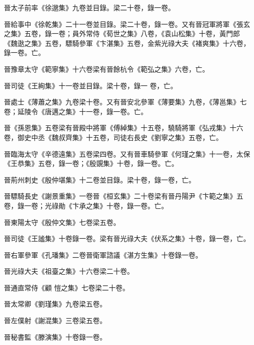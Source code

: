 \begin{pinyinscope}
 晉太子前率《徐邈集》九卷並目錄。梁二十卷，錄一卷。



 晉給事中《徐乾集》二十一卷並目錄。梁二十卷，錄一卷。又有晉冠軍將軍《張玄之集》五卷，錄一卷；員外常侍《荀世之集》八卷，《袁山松集》十卷，黃門郎《魏逖之集》五卷，驃騎參軍《卞湛集》五卷，金紫光祿大夫《褚爽集》十六卷，錄一卷。亡。



 晉豫章太守《範寧集》十六卷梁有晉餘杭令《範弘之集》六卷，亡。



 晉司徒《王絢集》十一卷並目錄。梁十卷，錄一
 卷，亡。



 晉處士《薄蕭之集》九卷梁十卷。又有晉安北參軍《薄要集》九卷，《薄邕集》七卷；延陵令《唐邁之集》十一卷，錄一卷。亡。



 晉《孫恩集》五卷梁有晉殿中將軍《傅綽集》十五卷，驍騎將軍《弘戎集》十六卷，御史中丞《魏叔齊集》十五卷，司徒右長史《劉寧之集》五卷，亡。



 晉臨海太守《辛德遠集》五卷梁四卷。又有晉車騎參軍《何瑾之集》十一卷，太保《王恭集》五卷，錄一卷；《殷覬集》十卷，錄一卷。亡。



 晉荊州刺史《殷仲堪集》十二卷並目錄。梁十卷，錄一卷，亡。



 晉驃騎長史《謝景重集》一卷晉《桓玄集》二十卷梁有晉丹陽尹《卞範之集》五卷，錄一卷；光祿勛《卞承之集》十卷，錄一卷。亡。



 晉東陽太守《殷仲文集》七卷梁五卷。



 晉司徒《王謐集》十卷錄一卷。梁有晉光祿大夫《伏系之集》十卷，錄一卷，亡。



 晉右軍參軍《孔璠集》二卷晉衛軍諮議《湛方生集》十卷錄一卷。



 晉光祿大夫《祖臺之集》十六卷梁二十卷。



 晉通直常侍《顧
 愷之集》七卷梁二十卷。



 晉太常卿《劉瑾集》九卷梁五卷。



 晉左僕射《謝混集》三卷梁五卷。



 晉秘書監《滕演集》十卷錄一卷。




\end{pinyinscope}
